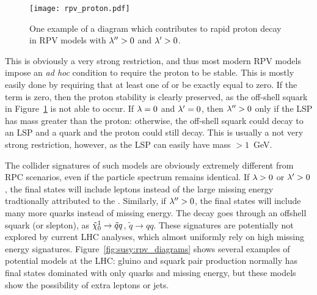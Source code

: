 
\begin{figure}
\centering
\texttt{[image: rpv\_proton.pdf]}
\label{fig:susy:rpv_proton}
\caption{One example of a diagram which contributes to rapid proton decay in RPV models with $\lambda^{\prime\prime} > 0$ and $\lambda^{\prime} > 0$.}
\end{figure}

This is obviously a very strong restriction, and thus most modern RPV models impose an \textit{ad hoc} condition to require the proton to be stable. This is mostly easily done by requiring that at least one of \lamp or \lampp be exactly equal to zero. If the \lampp term is zero, then the proton stability is clearly preserved, as the off-shell squark in Figure~\ref{fig:susy:rpv_proton} is not able to occur. If $\lambda = 0$ and $\lambda^{\prime} = 0$, then $\lambda^{\prime\prime} > 0$ only if the LSP has mass greater than the proton: otherwise, the off-shell squark could decay to an LSP and a quark and the proton could still decay. This is usually a not very strong restriction, however, as the LSP can easily have mass $> 1$~GeV.

The collider signatures of such models are obviously extremely different from RPC scenarios, even if the particle spectrum remains identical. If $\lambda > 0$ or $\lambda^{\prime} > 0$, the final states will include leptons instead of the large missing energy tradtionally attributed to the \lsp. Similarly, if $\lambda^{\prime\prime} > 0$, the final states will include many more quarks instead of missing energy. The decay goes through an offshell squark (or slepton), as $\tilde{\chi}_0^1 \rightarrow \tilde{q} q$, $\tilde{q}\rightarrow q q$. These signatures are potentially not explored by current LHC analyses, which almost uniformly rely on high missing energy signatures. Figure~\ref{fig:susy:rpv_diagrams} shows several examples of potential models at the LHC: gluino and squark pair production normally has final states dominated with only quarks and missing energy, but these models show the possibility of extra leptons or jets.



